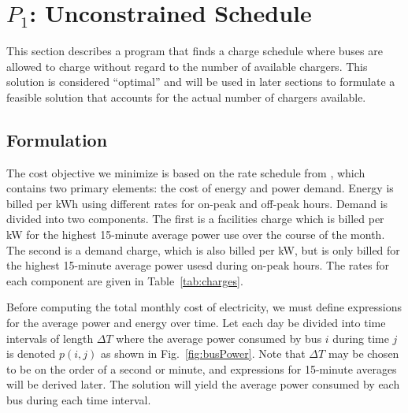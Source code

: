 \section{$P_1$: Unconstrained Schedule \label{sec:unconstrainedSchedule}}

This section describes a program that finds a charge schedule where buses are allowed to charge without regard to the number of available chargers. This solution is considered ``optimal'' and will be used in later sections to formulate a feasible solution that accounts for the actual number of chargers available.





\subsection{Formulation \label{sec:formulation}}

The cost objective we minimize is based on the rate schedule from \cite{rocky_mountain_power_rocky_2021}, which contains two primary elements: the cost of energy and power demand. Energy is billed per kWh using different rates for on-peak and off-peak hours.
Demand is divided into two components.  The first is a facilities charge which is billed per kW for the highest 15-minute average power use over the course of the month. The second is a demand charge, which is also billed per kW, but is only billed for the highest 15-minute average power usesd during on-peak hours. The rates for each component are given in Table~\ref{tab:charges}.  

Before computing the total monthly cost of electricity, we must define expressions for the average power and energy over time.  Let each day be divided into time intervals of length $\Delta T$ where the average power consumed by bus $i$ during time $j$ is denoted $p(i,j)$ as shown in Fig.~\ref{fig:busPower}. Note that $\Delta T$ may be chosen to be on the order of a second or minute, and expressions for 15-minute averages will be derived later. The solution will yield the average power consumed by each bus during each time interval.

